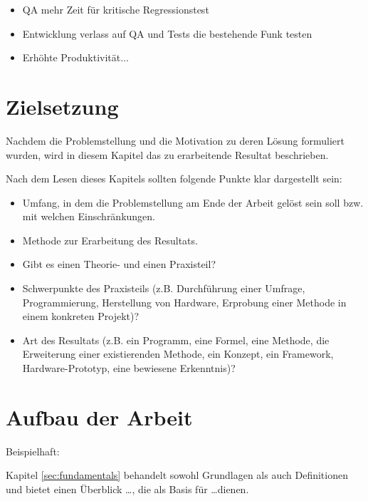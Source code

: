 \begin{itemize}
	\item QA mehr Zeit für kritische Regressionstest
	\item Entwicklung verlass auf QA und Tests die bestehende Funk testen
	\item Erhöhte Produktivität...
\end{itemize}

\section{Zielsetzung}

Nachdem die Problemstellung und die Motivation zu deren Lösung formuliert wurden, wird in diesem Kapitel das zu erarbeitende Resultat beschrieben. 

\makeatletter\ifthesis@masterthesis
Nach dem Lesen dieses Kapitels sollten folgende Punkte klar dargestellt sein:
\begin{itemize}
	\item Umfang, in dem die Problemstellung am Ende der Arbeit gelöst sein soll bzw. mit welchen Einschränkungen.
	\item Methode zur Erarbeitung des Resultats.
	\item Gibt es einen Theorie- und einen Praxisteil?
	\item Schwerpunkte des Praxisteils (z.B. Durchführung einer Umfrage, Programmierung, Herstellung von Hardware, Erprobung einer Methode in einem konkreten Projekt)?
	\item Art des Resultats (z.B. ein Programm, eine Formel, eine Methode, die Erweiterung einer existierenden Methode, ein Konzept, ein Framework, Hardware-Prototyp, eine bewiesene Erkenntnis)?
\end{itemize}
\fi\makeatother

\makeatletter\ifthesis@masterthesis
\section{Aufbau der Arbeit}

Beispielhaft:

Kapitel \ref{sec:fundamentals} behandelt sowohl Grundlagen als auch Definitionen und bietet einen Überblick \dots, die als Basis für \dots dienen.

